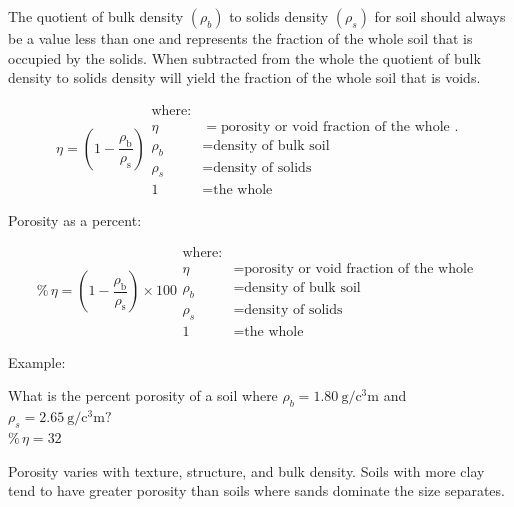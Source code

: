 \documentclass[letterpaper, 12pt]{article}
\begin{document}
The quotient of bulk density $\left(\rho_b\right)$ to solids density $\left(\rho_s\right)$ for soil should always be a value less than one and represents the fraction of the whole soil that is occupied by the solids. When subtracted from the whole the quotient of bulk density to solids density will yield the fraction of the whole soil that is voids.

\begin{equation}
    \eta =\left(1-\frac{\rho_{\text{b}}}{\rho_{\text{s}}}\right)
    \begin{aligned}
        \text{where:}                                            \\
        \eta &= \text{porosity or void fraction of the whole }.  \\
        \rho_b &= \text{density of bulk soil}                    \\
        \rho_s &= \text{density of solids}                       \\
        1 &= \text{the whole}
    \end{aligned}
\end{equation}

Porosity as a percent:

\begin{equation}
    \%\,\eta =\left(1-\frac{\rho_{\text{b}}}{\rho_{\text{s}}}\right) \times 100
    \begin{aligned}
        \text{where:}                                          \\
        \eta &= \text{porosity or void fraction of the whole } \\
        \rho_b &= \text{density of bulk soil}                  \\
        \rho_s &= \text{density of solids}                     \\
        1 &= \text{the whole}
    \end{aligned}
\end{equation}

Example:

What is the percent porosity of a soil where $\rho_b = \qty[per-mode=fraction]{1.80}{\gram\per\cubic\centi\meter}$ and $\rho_s = \qty[per-mode=fraction]{2.65}{\gram\per\cubic\centi\meter} ?$ \\
$\%\,\eta = 32$

Porosity varies with texture, structure, and bulk density. Soils with more clay tend to have greater porosity than soils where sands dominate the size separates.
\end{document}
